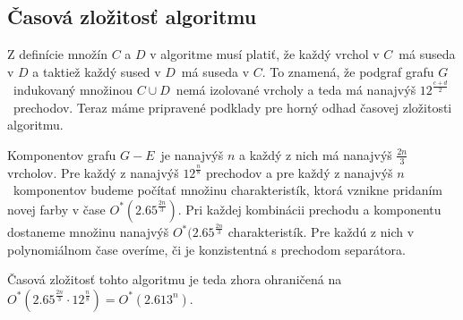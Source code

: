 \subsection{Časová zložitosť algoritmu}

Z definície množín $C$ a $D$ v algoritme musí platiť, že každý vrchol v $C$ má suseda v $D$ a taktiež
každý sused v $D$ má suseda v $C$. To znamená, že podgraf grafu $G$ indukovaný množinou $C \cup D$ nemá
izolované vrcholy a teda má nanajvýš $12^{\frac{c+d}{2}}$ prechodov. Teraz máme pripravené podklady
pre horný odhad časovej zložitosti algoritmu.

Komponentov grafu $G - E$ je nanajvýš $n$ a každý z nich má nanajvýš $\frac{2n}{3}$ vrcholov. Pre každý
z nanajvýš $12^{\frac{n}{8}}$ prechodov a pre každý z nanajvýš $n$ komponentov budeme počítať množinu
charakteristík, ktorá vznikne pridaním novej farby v čase $O^*(2.65^{\frac{2n}{3}})$. Pri každej
kombinácii prechodu a komponentu dostaneme množinu nanajvýš $O^*(2.65^{\frac{2n}{3}}$ charakteristík.
Pre každú z nich v polynomiálnom čase overíme, či je konzistentná s prechodom separátora.

Časová zložitosť tohto algoritmu je teda zhora ohraničená na $O^*(2.65^{\frac{2n}{3}} \cdot 12^{\frac{n}{8}}) = O^*(2.613^n)$.
